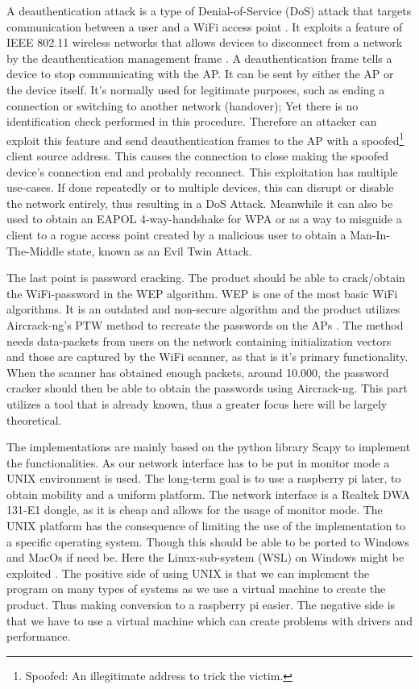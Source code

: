 A deauthentication attack is a type of Denial-of-Service (DoS) attack that targets communication between a user and a WiFi access point \cite{Deauth}. It exploits a feature of IEEE 802.11 wireless networks that allows devices to disconnect from a network by the deauthentication management frame \cite{Deauth_Wiki}.
A deauthentication frame tells a device to stop communicating with the AP. It can be sent by either the AP or the device itself. It's normally used for legitimate purposes, such as ending a connection or switching to another network (handover); Yet there is no identification check performed in this procedure. Therefore an attacker can exploit this feature and send deauthentication frames to the AP with a spoofed\footnote{Spoofed: An illegitimate address to trick the victim.} client source address. This causes the connection to close making the spoofed device's connection end and probably reconnect. This exploitation has multiple use-cases. If done repeatedly or to multiple devices, this can disrupt or disable the network entirely, thus resulting in a DoS Attack. Meanwhile it can also be used to obtain an EAPOL 4-way-handshake for WPA or as a way to misguide a client to a rogue access point created by a malicious user to obtain a Man-In-The-Middle state, known as an Evil Twin Attack. 

The last point is password cracking. The product should be able to crack/obtain the WiFi-password in the WEP algorithm. WEP is one of the most basic WiFi algorithms. It is an outdated and non-secure algorithm and the product utilizes Aircrack-ng's PTW method to recreate the passwords on the APs \cite{aircrack-ng}. The method needs data-packets from users on the network containing initialization vectors and those are captured by the WiFi scanner, as that is it's primary functionality. When the scanner has obtained enough packets, around 10.000, the password cracker should then be able to obtain the passwords using Aircrack-ng. This part utilizes a tool that is already known, thus a greater focus here will be largely theoretical.

The implementations are mainly based on the python library Scapy \cite{scapy} to implement the functionalities. As our network interface has to be put in monitor mode a UNIX environment is used. The long-term goal is to use a raspberry pi later, to obtain mobility and a uniform platform. 
The network interface is a Realtek DWA 131-E1 dongle, as it is cheap and allows for the usage of monitor mode. The UNIX platform has the consequence of limiting the use of the implementation to a specific operating system. Though this should be able to be ported to Windows and MacOs if need be. Here the Linux-sub-system (WSL) on Windows might be exploited \cite{WSL_exploit}.
The positive side of using UNIX is that we can implement the program on many types of systems as we use a virtual machine to create the product. Thus making conversion to a raspberry pi easier. The negative side is that we have to use a virtual machine which can create problems with drivers and performance. 

